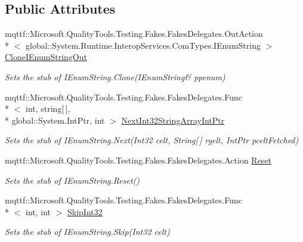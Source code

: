 \subsection*{Public Attributes}
\begin{DoxyCompactItemize}
\item 
mqttf\-::\-Microsoft.\-Quality\-Tools.\-Testing.\-Fakes.\-Fakes\-Delegates.\-Out\-Action\\*
$<$ global\-::\-System.\-Runtime.\-Interop\-Services.\-Com\-Types.\-I\-Enum\-String $>$ \hyperlink{class_system_1_1_runtime_1_1_interop_services_1_1_com_types_1_1_fakes_1_1_stub_i_enum_string_ae41403607231b8f9669498f77763ca0c}{Clone\-I\-Enum\-String\-Out}
\begin{DoxyCompactList}\small\item\em Sets the stub of I\-Enum\-String.\-Clone(I\-Enum\-String\& ppenum)\end{DoxyCompactList}\item 
mqttf\-::\-Microsoft.\-Quality\-Tools.\-Testing.\-Fakes.\-Fakes\-Delegates.\-Func\\*
$<$ int, string\mbox{[}$\,$\mbox{]}, \\*
global\-::\-System.\-Int\-Ptr, int $>$ \hyperlink{class_system_1_1_runtime_1_1_interop_services_1_1_com_types_1_1_fakes_1_1_stub_i_enum_string_af6e7e3ea07ccdf572ae42b46963c26bc}{Next\-Int32\-String\-Array\-Int\-Ptr}
\begin{DoxyCompactList}\small\item\em Sets the stub of I\-Enum\-String.\-Next(\-Int32 celt, String\mbox{[}$\,$\mbox{]} rgelt, Int\-Ptr pcelt\-Fetched)\end{DoxyCompactList}\item 
mqttf\-::\-Microsoft.\-Quality\-Tools.\-Testing.\-Fakes.\-Fakes\-Delegates.\-Action \hyperlink{class_system_1_1_runtime_1_1_interop_services_1_1_com_types_1_1_fakes_1_1_stub_i_enum_string_a2e92e532abe9785cef4238ac31b8be3e}{Reset}
\begin{DoxyCompactList}\small\item\em Sets the stub of I\-Enum\-String.\-Reset()\end{DoxyCompactList}\item 
mqttf\-::\-Microsoft.\-Quality\-Tools.\-Testing.\-Fakes.\-Fakes\-Delegates.\-Func\\*
$<$ int, int $>$ \hyperlink{class_system_1_1_runtime_1_1_interop_services_1_1_com_types_1_1_fakes_1_1_stub_i_enum_string_a08a89d1c03b6b62ddb06306112b2044a}{Skip\-Int32}
\begin{DoxyCompactList}\small\item\em Sets the stub of I\-Enum\-String.\-Skip(\-Int32 celt)\end{DoxyCompactList}\end{DoxyCompactItemize}


